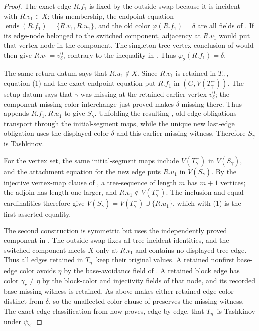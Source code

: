 \begin{proof}
The exact edge $R.f_1$ is fixed by the outside swap because it is
incident with $R.v_1\in X$; this membership, the endpoint equation
$\operatorname{ends}(R.f_1)=\{R.v_1,R.u_1\}$, and the old color
$\varphi(R.f_1)=\delta$ are all fields of
.  If its edge-node belonged to the
switched component, adjacency at $R.v_1$ would put that vertex-node in
the component.  The singleton tree-vertex conclusion of
 would then give
$R.v_1=v^0_\delta$, contrary to the inequality in
.  Thus
$\varphi_2(R.f_1)=\delta$.

The same return datum  says that
$R.u_1\notin X$.  Since $R.v_1$ is retained in $T^-_\gamma$, equation
(1) and the exact endpoint equation put $R.f_1$ in
$(G,V(T^-_\gamma))$.  The setup datum
 says that $\gamma$ was missing at the
retained earlier vertex $v^0_\delta$; the component missing-color
interchange just proved makes $\delta$ missing there.  Thus
 appends
$R.f_1,R.u_1$ to give $S_\gamma$.  Unfolding the resulting
, old edge obligations transport through
the initial-segment maps, while the unique new last-edge obligation uses
the displayed color $\delta$ and this earlier missing witness.  Therefore
$S_\gamma$ is Tashkinov.

For the vertex set, the same initial-segment maps include
$V(T^-_\gamma)$ in $V(S_\gamma)$, and the attachment equation for the
new edge puts $R.u_1$ in $V(S_\gamma)$.  By the injective vertex-map
clause of , a tree-sequence of length $m$ has
$m+1$ vertices; the adjoin has length one larger, and
$R.u_1\notin V(T^-_\gamma)$.  The inclusion and equal cardinalities
therefore give
$V(S_\gamma)=V(T^-_\gamma)\cup\{R.u_1\}$, which with (1) is the first
asserted equality.

The second construction is symmetric but uses the independently proved
component in .  The
outside swap fixes all tree-incident identities, and the switched
component meets $X$ only at $R.v_1$ and contains no displayed tree edge.
Thus all edges retained in $T^-_\eta$ keep their original values.  A
retained nonfirst base-edge color avoids $\eta$ by the base-avoidance
field of .  A retained block
edge has color $\gamma_r\ne\eta$ by the block-color and injectivity
fields of that node, and its recorded base missing witness is retained.
As above  makes either retained
edge color distinct from $\delta$, so the unaffected-color clause of
 preserves the missing
witness.  The exact-edge classification from
 now proves, edge by edge, that
$T^-_\eta$ is Tashkinov under $\psi_2$.


\end{proof}
